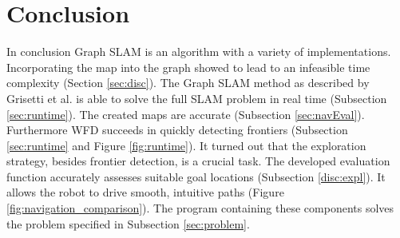 \documentclass{ba-kecs}
\begin{document}
\section{Conclusion}
\label{sec:conc}
In conclusion Graph SLAM is an algorithm with a variety of implementations. Incorporating the map into the graph showed to lead to an infeasible time complexity (Section \ref{sec:disc}). The Graph SLAM method as described by Grisetti et al. \citep{Grisetti} is able to solve the full SLAM problem in real time (Subsection \ref{sec:runtime}). The created maps are accurate (Subsection \ref{sec:navEval}). Furthermore WFD succeeds in quickly detecting frontiers (Subsection \ref{sec:runtime} and Figure \ref{fig:runtime}). It turned out that the exploration strategy, besides frontier detection, is a crucial task. The developed evaluation function accurately assesses suitable goal locations (Subsection \ref{disc:expl}). It allows the robot to drive smooth, intuitive paths (Figure \ref{fig:navigation_comparison}). The program containing these components solves the problem specified in Subsection \ref{sec:problem}.


\nocite{*}
\onecolumn
\appendix
\end{document}
